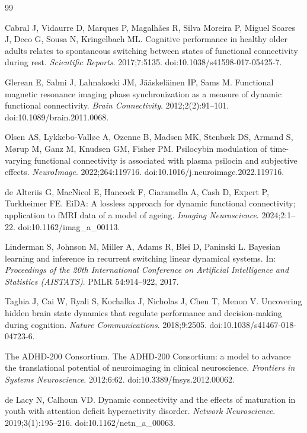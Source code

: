 \documentclass[11pt]{article}
\theoremstyle{definition}
\begin{document}
\begin{thebibliography}{99}

Cabral J, Vidaurre D, Marques P, Magalh\~aes R, Silva Moreira P, Miguel Soares J, Deco G,
Sousa N, Kringelbach ML.
Cognitive performance in healthy older adults relates to spontaneous switching between
states of functional connectivity during rest.
\textit{Scientific Reports}. 2017;7:5135. doi:10.1038/s41598-017-05425-7.

Glerean E, Salmi J, Lahnakoski JM, J\"a\"askel\"ainen IP, Sams M.
Functional magnetic resonance imaging phase synchronization as a measure of dynamic
functional connectivity.
\textit{Brain Connectivity}. 2012;2(2):91--101. doi:10.1089/brain.2011.0068.

Olsen AS, Lykkebo-Vall\o e A, Ozenne B, Madsen MK, Stenb\ae k DS, Armand S, M\o rup M, Ganz
M, Knudsen GM, Fisher PM.
Psilocybin modulation of time-varying functional connectivity is associated with plasma
psilocin and subjective effects.
\textit{NeuroImage}. 2022;264:119716. doi:10.1016/j.neuroimage.2022.119716.

de Alteriis G, MacNicol E, Hancock F, Ciaramella A, Cash D, Expert P, Turkheimer FE.
EiDA: A lossless approach for dynamic functional connectivity; application to fMRI data of
a model of ageing.
\textit{Imaging Neuroscience}. 2024;2:1--22. doi:10.1162/imag\_a\_00113.

Linderman S, Johnson M, Miller A, Adams R, Blei D, Paninski L.
Bayesian learning and inference in recurrent switching linear dynamical systems.
In: \textit{Proceedings of the 20th International Conference on Artificial Intelligence and
Statistics (AISTATS)}. PMLR 54:914--922, 2017.

Taghia J, Cai W, Ryali S, Kochalka J, Nicholas J, Chen T, Menon V.
Uncovering hidden brain state dynamics that regulate performance and decision-making during
cognition.
\textit{Nature Communications}. 2018;9:2505. doi:10.1038/s41467-018-04723-6.

The ADHD-200 Consortium.
The ADHD-200 Consortium: a model to advance the translational potential of neuroimaging in
clinical neuroscience.
\textit{Frontiers in Systems Neuroscience}. 2012;6:62. doi:10.3389/fnsys.2012.00062.

de Lacy N, Calhoun VD.
Dynamic connectivity and the effects of maturation in youth with attention deficit
hyperactivity disorder.
\textit{Network Neuroscience}. 2019;3(1):195--216. doi:10.1162/netn\_a\_00063.


\end{thebibliography}
\end{document}
